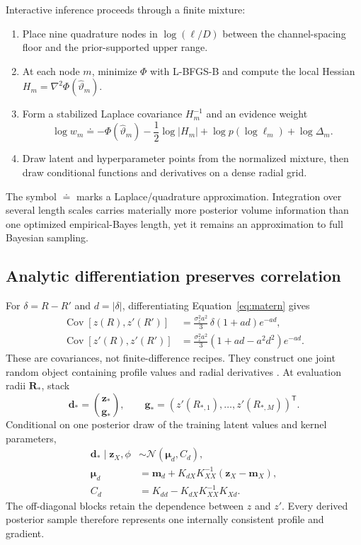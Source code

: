 \documentclass[10pt,twocolumn]{article}
\newcommand{\Normal}{\mathcal{N}}
\begin{document}
Interactive inference proceeds through a finite mixture:
\begin{enumerate}
\item Place nine quadrature nodes in $\log(\ell/D)$ between the channel-spacing
floor and the prior-supported upper range.
\item At each node $m$, minimize $\Phi$ with L-BFGS-B and compute the local
Hessian $H_m=\nabla^2\Phi(\widehat\vartheta_m)$.
\item Form a stabilized Laplace covariance $H_m^{-1}$ and an evidence weight
\begin{equation}
\log w_m\doteq-\Phi(\widehat\vartheta_m)
-\frac12\log|H_m|+\log p(\log\ell_m)+\log\Delta_m.
\end{equation}
\item Draw latent and hyperparameter points from the normalized mixture, then
draw conditional functions and derivatives on a dense radial grid.
\end{enumerate}
The symbol $\doteq$ marks a Laplace/quadrature approximation.  Integration over
several length scales carries materially more posterior volume information
than one optimized empirical-Bayes length, yet it remains an approximation to
full Bayesian sampling.

\subsection{Analytic differentiation preserves correlation}

For $\delta=R-R'$ and $d=|\delta|$, differentiating
Equation~\eqref{eq:matern} gives
\begin{align}
\operatorname{Cov}[z(R),z'(R')]
&=\frac{\sigma_z^2a^2}{3}\,
\delta(1+ad)e^{-ad},\label{eq:crosscov}\\
\operatorname{Cov}[z'(R),z'(R')]
&=\frac{\sigma_z^2a^2}{3}
\left(1+ad-a^2d^2\right)e^{-ad}.
\label{eq:derivcov}
\end{align}
These are covariances, not finite-difference recipes.  They construct one joint
random object containing profile values and radial derivatives
\cite{solak2003}.  At evaluation radii $\mathbf R_*$, stack
\begin{equation}
\mathbf d_*=\binom{\mathbf z_*}{\mathbf g_*},
\qquad
\mathbf g_*=(z'(R_{*,1}),\ldots,z'(R_{*,M}))^{\mathsf T}.
\end{equation}
Conditional on one posterior draw of the training latent values and kernel
parameters,
\begin{align}
\mathbf d_*\mid\mathbf z_X,\phi
&\sim\Normal(\boldsymbol\mu_d,C_d),\label{eq:jointconditional}\\
\boldsymbol\mu_d
&=\mathbf m_d+K_{dX}K_{XX}^{-1}(\mathbf z_X-\mathbf m_X),\\
C_d&=K_{dd}-K_{dX}K_{XX}^{-1}K_{Xd}.
\end{align}
The off-diagonal blocks retain the dependence between $z$ and $z'$.  Every
derived posterior sample therefore represents one internally consistent
profile and gradient.
\end{document}
